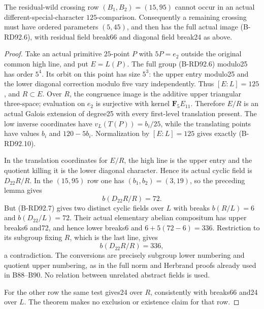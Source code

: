 \begin{theorem}
\label{thm:B-RD92-crossing}
The residual-wild crossing row \((B_1,B_2)=(15,95)\) cannot occur
in an actual different-special-character \(125\)-comparison.
Consequently a remaining crossing must have ordered parameters
\((5,45)\), and then has the full actual image (B-RD92.6),
with residual field break66 and diagonal field break24 as above.
\end{theorem}
\begin{proof}
Take an actual primitive \(25\)-point \(P\) with \(5P=e_2\)
outside the original common high line, and put \(E=L(P)\).
The full group (B-RD92.6) modulo25 has order \(5^4\). Its orbit
on this point has size \(5^3\): the upper entry modulo25 and
the lower diagonal correction modulo five vary independently.
Thus \([E:L]=125\), and \(R\subset E\). Over \(R\), the
congruence image is the additive upper triangular three-space;
evaluation on \(e_2\) is surjective with kernel
\(\mathbf F_5E_{11}\). Therefore \(E/R\) is an actual Galois
extension of degree25 with every first-level translation present.
The low inverse coordinates have \(v_L(T(P))=b_i/25\), while
the translating points have values \(b_i\) and \(120-5b_i\).
Normalization by \([E:L]=125\) gives exactly (B-RD92.10).

In the translation coordinates for \(E/R\), the high line is
the upper entry and the quotient killing it is the lower diagonal
character. Hence its actual cyclic field is \(D_{22}R/R\).
In the \((15,95)\) row one has \((b_1,b_2)=(3,19)\), so
the preceding lemma gives
\[
                         b(D_{22}R/R)=72.             \tag{B-RD92.13}
\]
But (B-RD92.7) gives two distinct cyclic fields over \(L\) with
breaks \(b(R/L)=6\) and \(b(D_{22}/L)=72\). Their actual
elementary abelian compositum has upper breaks6 and72, and hence
lower breaks6 and \(6+5(72-6)=336\). Restriction to its subgroup
fixing \(R\), which is the last line, gives
\[
                         b(D_{22}R/R)=336,             \tag{B-RD92.14}
\]
a contradiction. The conversions are precisely subgroup lower
numbering and quotient upper numbering, as in the full norm and
Herbrand proofs already used in B88--B90. No relation between
unrelated abstract fields is used.

For the other row the same test gives24 over \(R\), consistently
with breaks66 and24 over \(L\). The theorem makes no exclusion
or existence claim for that row.
\end{proof}

